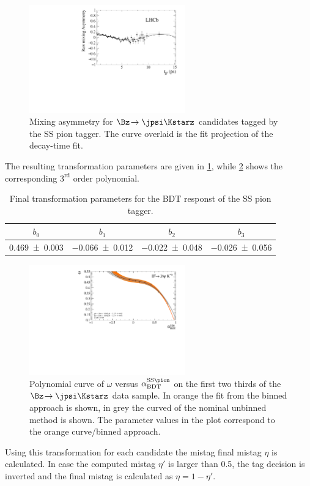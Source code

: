 \begin{figure}[tbp]
	\begin{center}
		\includegraphics[width=0.6\textwidth]{08FlavourTagging/figs/Asymmetry_SSPion.pdf}
	\end{center}
	\caption{Mixing asymmetry for $\Bz\!\to\jpsi\Kstarz$ candidates tagged by the SS pion tagger.
	The curve overlaid is the fit projection of the decay-time fit.}
	\label{fig:MixingSSPion}
\end{figure}
The resulting transformation parameters are given in \cref{tab:transformationSSPion}, while \cref{fig:transformationSSPion} shows the corresponding $3^{\text{rd}}$ order polynomial.
\begin{table}[tbp]
	\centering
	\caption{Final transformation parameters for the BDT responst of the SS pion tagger.}
	\begin{tabular}{cccc}
		\toprule
		$b_0$ & $b_1$ & $b_2$ & $b_3$ \\
		\midrule
		\num{0.469\pm0.003} & \num{-0.066\pm0.012} & \num{-0.022\pm0.048} & \num{-0.026\pm0.056} \\
		\bottomrule
	\end{tabular}
	\label{tab:transformationSSPion}
\end{table}
\begin{figure}[tbp]
	\begin{center}
		\includegraphics[width=0.6\textwidth]{08FlavourTagging/figs/SSPionBDTTrafo.pdf}
	\end{center}
	\caption{Polynomial curve of $\omega$ versus $\alpha^{\text{SS}\pion}_\text{BDT}$ on the first two thirds of the $\Bz\!\to\jpsi\Kstarz$ data sample.
	In orange the fit from the binned approach is shown, in grey the curved of the nominal unbinned method is shown.
	The parameter values in the plot correspond to the orange curve/binned approach.}
	\label{fig:transformationSSPion}
\end{figure}
Using this transformation for each \Bz candidate the mistag final mistag $\eta$ is calculated.
In case the computed mistag $\eta'$ is larger than \num{0.5}, the tag decision is inverted and the final mistag is calculated as $\eta=1-\eta'$.

